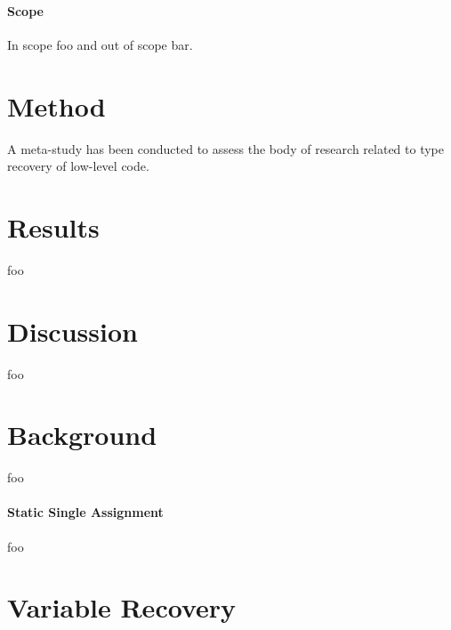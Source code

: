 \documentclass[10pt, a4paper, sigplan, authordraft]{acmart}
\begin{document}
\paragraph{Scope}


In scope foo and out of scope bar.


\section{Method}

A meta-study has been conducted to assess the body of research related to type recovery of low-level code.


\section{Results}

foo


\section{Discussion}

foo



\section{Background}

foo

\paragraph{Static Single Assignment}

foo


\section{Variable Recovery}
\end{document}
